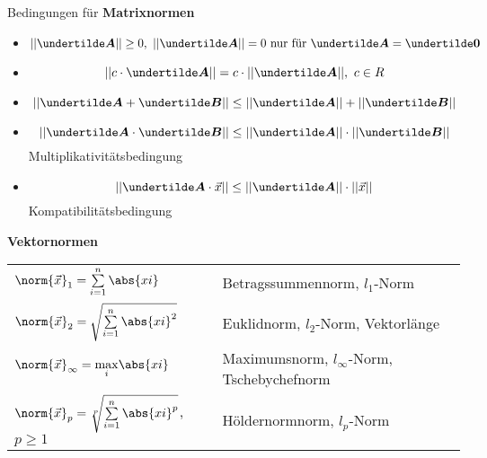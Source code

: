 Bedingungen für \textbf{Matrixnormen}
\begin{itemize}
\item \[||\ma{A}|| \geq 0,\ ||\ma{A}|| = 0 \text{ nur für } \ma{A} = \ma{0}\]
\item \[|| c \cdot \ma{A}|| = c \cdot ||\ma{A}||,\ c \in R\]
\item \[||\ma{A} + \ma{B}|| \leq ||\ma{A}|| + ||\ma{B}||\]
\item \[||\ma{A} \cdot \ma{B}|| \leq ||\ma{A}|| \cdot ||\ma{B}||\] Multiplikativitätsbedingung
\item \[||\ma{A} \cdot \vec{x}|| \leq ||\ma{A}|| \cdot ||\vec{x}||\] Kompatibilitätsbedingung
\end{itemize}

\textbf{Vektornormen}\\
\begin{tabular}{ll}
$\norm{\vec{x}}_1 = \sum\limits_{i=1}^n\abs{xi}$ & Betragssummennorm, $l_1$-Norm\\
$\norm{\vec{x}}_2 = \sqrt{\sum\limits_{i=1}^n\abs{xi}^2}$ & Euklidnorm, $l_2$-Norm, Vektorlänge\\
$\norm{\vec{x}}_\infty = \underset{i}{\max}{\abs{xi}}$ & Maximumsnorm, $l_\infty$-Norm, Tschebychefnorm\\
$\norm{\vec{x}}_p = \sqrt[p]{\sum\limits_{i=1}^n\abs{xi}^p}$, $p\geq 1$ & Höldernormnorm, $l_p$-Norm
\end{tabular}